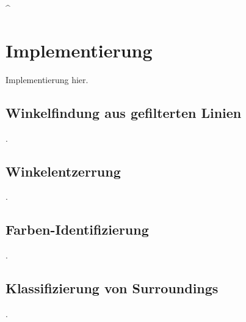 ^
\section{Implementierung}
\label{sec:cv:implementierung}

Implementierung hier.

\subsection{Winkelfindung aus gefilterten Linien}
\label{sec:winkelfindung_impl}

.

\subsection{Winkelentzerrung}
\label{sec:winkelentzerrung_impl}

.

\subsection{Farben-Identifizierung}
\label{sec:farbidentifizierung_impl}

.

\subsection{Klassifizierung von Surroundings}
\label{sec:surroundings_impl}

.

